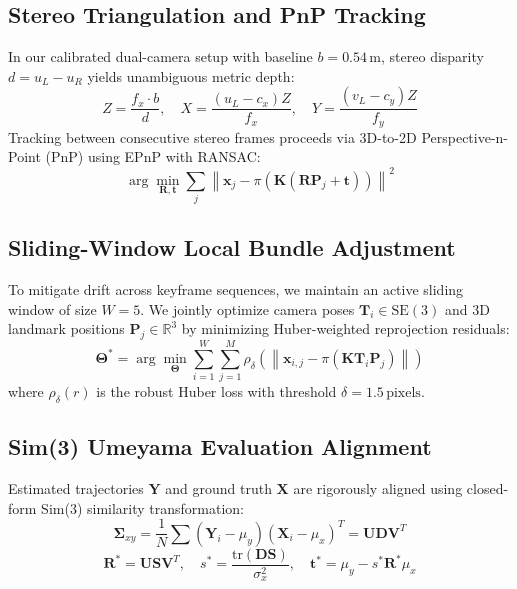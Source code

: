 \documentclass[conference]{IEEEtran}
\begin{document}
\subsection{Stereo Triangulation and PnP Tracking}
In our calibrated dual-camera setup with baseline $b = 0.54\,\text{m}$, stereo disparity $d = u_L - u_R$ yields unambiguous metric depth:
\begin{equation}
Z = \frac{f_x \cdot b}{d}, \quad X = \frac{(u_L - c_x) Z}{f_x}, \quad Y = \frac{(v_L - c_y) Z}{f_y}
\end{equation}
Tracking between consecutive stereo frames proceeds via 3D-to-2D Perspective-n-Point (PnP) using EPnP with RANSAC:
\begin{equation}
\arg\min_{\mathbf{R}, \mathbf{t}} \sum_{j} \left\| \mathbf{x}_j - \pi\left(\mathbf{K} (\mathbf{R} \mathbf{P}_j + \mathbf{t})\right) \right\|^2
\end{equation}

\subsection{Sliding-Window Local Bundle Adjustment}
To mitigate drift across keyframe sequences, we maintain an active sliding window of size $W = 5$. We jointly optimize camera poses $\mathbf{T}_i \in \text{SE}(3)$ and 3D landmark positions $\mathbf{P}_j \in \mathbb{R}^3$ by minimizing Huber-weighted reprojection residuals:
\begin{equation}
\mathbf{\Theta}^* = \arg\min_{\mathbf{\Theta}} \sum_{i=1}^W \sum_{j=1}^M \rho_\delta \left( \left\| \mathbf{x}_{i,j} - \pi(\mathbf{K} \mathbf{T}_i \mathbf{P}_j) \right\| \right)
\end{equation}
where $\rho_\delta(r)$ is the robust Huber loss with threshold $\delta = 1.5\,\text{pixels}$.

\subsection{Sim(3) Umeyama Evaluation Alignment}
Estimated trajectories $\mathbf{Y}$ and ground truth $\mathbf{X}$ are rigorously aligned using closed-form Sim(3) similarity transformation:
\begin{equation}
\mathbf{\Sigma}_{xy} = \frac{1}{N}\sum (\mathbf{Y}_i - \mu_y)(\mathbf{X}_i - \mu_x)^T = \mathbf{U} \mathbf{D} \mathbf{V}^T
\end{equation}
\begin{equation}
\mathbf{R}^* = \mathbf{U} \mathbf{S} \mathbf{V}^T, \quad s^* = \frac{\text{tr}(\mathbf{D} \mathbf{S})}{\sigma_x^2}, \quad \mathbf{t}^* = \mu_y - s^* \mathbf{R}^* \mu_x
\end{equation}
\end{document}

